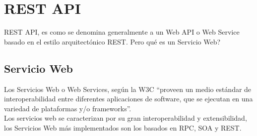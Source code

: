 
\section{REST API}
\label{sec:REST API}

REST API, es como se denomina generalmente a un Web API o Web Service basado en el estilo arquitectónico REST. Pero qué es un Servicio Web?

\subsection{Servicio Web}
\label{sub:Servicio Web}

Los Servicios Web o Web Services, según la W3C ``proveen un medio estándar de interoperabilidad entre diferentes aplicaciones de software, que se ejecutan en una variedad de plataformas y/o frameworks''.\cite{w3c_web_service} \\

Los servicios web se caracterizan por su gran interoperabilidad y extensibilidad, los Servicios Web más implementados son los basados en RPC, SOA y REST.

